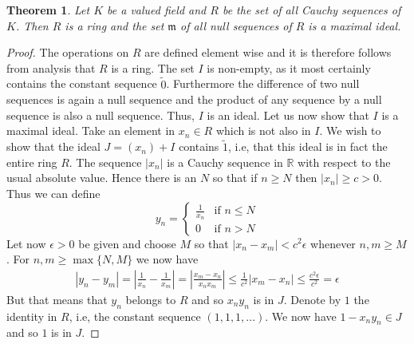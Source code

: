 \documentclass{article}
\newtheorem{theorem}{Theorem}[section]
\newcommand{\mfrak}[1]{\mathfrak{#1}}
\newcommand{\mbb}[1]{\mathbb{#1}}
\begin{document}
\begin{theorem}
    Let $K$ be a valued field and $R$ be the set of all Cauchy sequences of $K$. Then $R$ is a ring and the set $\mfrak m$ of all null sequences of $R$ is a maximal ideal.
\end{theorem}
\begin{proof}
    The operations on $R$ are defined element wise and it is therefore follows from analysis that $R$ is a ring. The set $I$ is non-empty, as it most certainly contains the constant sequence $\tilde 0$. Furthermore the difference of two null sequences is again a null sequence and the product of any sequence by a null sequence is also a null sequence. Thus, $I$ is an ideal. Let us now show that $I$ is a maximal ideal. Take an element in $x_n \in R$ which is not also in $I$. We wish to show that the ideal $J = (x_n) + I$ contains $\tilde 1$, i.e, that this ideal is in fact the entire ring $R$. The sequence $|x_n|$ is a Cauchy sequence in $\mbb R$ with respect to the usual absolute value. Hence there is an $N$ so that if $n \geq N$ then $|x_n| \geq c > 0$. Thus we can define 
    $$y_n = \begin{cases} \frac{1}{x_n} & \text{if } n \leq N \\ 0 & \text{if } n > N \end{cases}$$
    Let now $\epsilon > 0$ be given and choose $M$ so that $|x_n - x_m| < c^2 \epsilon$ whenever $n,m \geq M$. For $n,m \geq \max\{N,M\}$ we now have
    \begin{align*}
        |y_n - y_m| = |\frac{1}{x_n} - \frac{1}{x_m}| = |\frac{x_m - x_n}{x_n x_m}| \leq \frac{1}{c^2} |x_m - x_n| \leq \frac{c^2 \epsilon}{c^2} = \epsilon
    \end{align*}
    But that means that $y_n$ belongs to $R$ and so $x_n y_n$ is in $J$. Denote by $1$ the identity in $R$, i.e, the constant sequence $(1,1,1, ...)$. We now have $1 - x_n y_n \in J$ and so $1$ is in $J$.

\end{proof}
\end{document}
